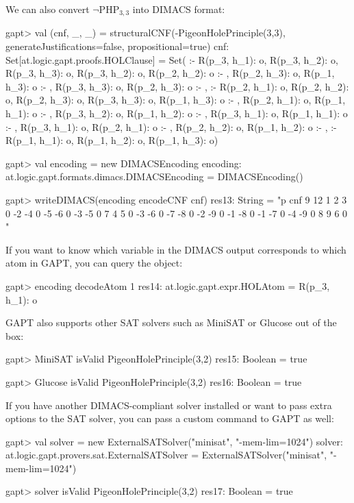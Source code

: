 \documentclass[a4paper,11pt]{article}
\newcommand{\cli}[1]{{\ttfamily {#1}}}
\begin{document}
We can also convert $\neg\mathrm{PHP}_{3,3}$ into DIMACS format:
\begin{clilisting}
gapt> val (cnf, _, _) = structuralCNF(-PigeonHolePrinciple(3,3), generateJustifications=false, propositional=true)
cnf: Set[at.logic.gapt.proofs.HOLClause] = Set( :- R(p_3, h_1): o, R(p_3, h_2): o, R(p_3, h_3): o, R(p_3, h_2): o, R(p_2, h_2): o :- , R(p_2, h_3): o, R(p_1, h_3): o :- , R(p_3, h_3): o, R(p_2, h_3): o :- ,  :- R(p_2, h_1): o, R(p_2, h_2): o, R(p_2, h_3): o, R(p_3, h_3): o, R(p_1, h_3): o :- , R(p_2, h_1): o, R(p_1, h_1): o :- , R(p_3, h_2): o, R(p_1, h_2): o :- , R(p_3, h_1): o, R(p_1, h_1): o :- , R(p_3, h_1): o, R(p_2, h_1): o :- , R(p_2, h_2): o, R(p_1, h_2): o :- ,  :- R(p_1, h_1): o, R(p_1, h_2): o, R(p_1, h_3): o)

gapt> val encoding = new DIMACSEncoding
encoding: at.logic.gapt.formats.dimacs.DIMACSEncoding = DIMACSEncoding()

gapt> writeDIMACS(encoding encodeCNF cnf)
res13: String =
"p cnf 9 12
1 2 3 0
-2 -4 0
-5 -6 0
-3 -5 0
7 4 5 0
-3 -6 0
-7 -8 0
-2 -9 0
-1 -8 0
-1 -7 0
-4 -9 0
8 9 6 0
"

\end{clilisting}

If you want to know which variable in the DIMACS output corresponds to which
atom in GAPT, you can query the \cli{DIMACSEncoding} object:
\begin{clilisting}
gapt> encoding decodeAtom 1
res14: at.logic.gapt.expr.HOLAtom = R(p_3, h_1): o

\end{clilisting}

GAPT also supports other SAT solvers such as MiniSAT or Glucose out of the box:
\begin{clilisting}
gapt> MiniSAT isValid PigeonHolePrinciple(3,2)
res15: Boolean = true

\end{clilisting}
\begin{clilisting}
gapt> Glucose isValid PigeonHolePrinciple(3,2)
res16: Boolean = true

\end{clilisting}

If you have another DIMACS-compliant solver installed or want to pass extra
options to the SAT solver, you can pass a custom command to GAPT as well:
\begin{clilisting}
gapt> val solver = new ExternalSATSolver("minisat", "-mem-lim=1024")
solver: at.logic.gapt.provers.sat.ExternalSATSolver = ExternalSATSolver("minisat", "-mem-lim=1024")

gapt> solver isValid PigeonHolePrinciple(3,2)
res17: Boolean = true

\end{clilisting}
\end{document}
